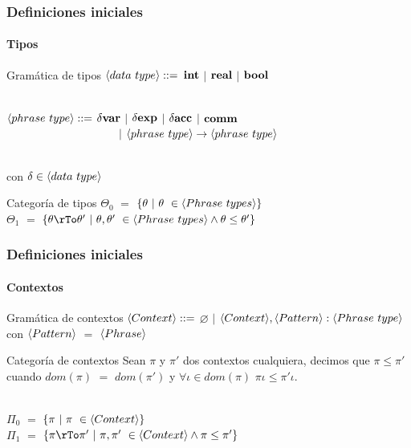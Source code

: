 \documentclass{beamer} %
\begin{document}
\begin{frame}
\frametitle{Definiciones iniciales}
\framesubtitle{Tipos}

\begin{block}{Gram\'atica de tipos}
$\langle data \ type \rangle ::=$ $\textbf{int}$ $|$ $\textbf{real}$ $|$ $\textbf{bool}$\\
\

$\langle phrase \ type \rangle::=$ $\delta \textbf{var}$ $|$ $\delta \textbf{exp}$ $|$ $\delta \textbf{acc}$ $|$ $\textbf{comm}$\\
\ \ \ \ \ \ \ \ \ \ \ \ \ \ \ \ \ \ \ \ 
$|$ $\langle phrase \ type \rangle \rightarrow \langle phrase \ type \rangle$ \\
\

con $\delta \in \lrangles{data \ type}$\\
\end{block}

\begin{block}{Categor\'ia de tipos}
$\Theta_0$ $=$ $\{\theta \ | \ \theta \ \in \langle Phrase \ types \rangle \}$\\
$\Theta_1$ $=$ $\{\theta \rTo \theta' \ | \ \theta,\theta' \ \in \lrangles{Phrase \ types} \wedge \theta \leq \theta' \}$\\
\end{block}
\end{frame}

\begin{frame}
\frametitle{Definiciones iniciales}
\framesubtitle{Contextos}

\begin{block}{Gram\'atica de contextos}
$\langle Context \rangle::=$ $\varnothing$ $|$ $\langle Context \rangle, \langle Pattern \rangle:\langle Phrase \ type \rangle$\\
con $\langle Pattern \rangle$ $=$ $\langle Phrase \rangle$
\end{block}

\begin{block}{Categor\'ia de contextos}
Sean $\pi$ y $\pi'$ dos contextos cualquiera, decimos que 
$\pi \leq \pi'$ cuando $dom(\pi)$ $=$ $dom(\pi')$ y $\forall \iota \in dom(\pi)$ 
$\pi \iota \leq \pi' \iota$. \\
\

$\Pi_0$ $=$ $\{\pi \ | \ \pi \ \in \langle Context \rangle \}$\\
$\Pi_1$ $=$ $\{\pi \rTo \pi' \ | \ \pi,\pi' \ \in \lrangles{Context} \wedge \pi \leq \pi' \}$\\
\end{block}
\end{frame}
\end{document}
